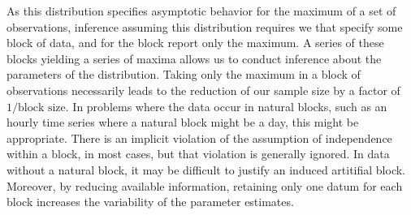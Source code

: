 As this distribution specifies asymptotic behavior for the maximum of a set of observations,
  inference assuming this distribution requires we that specify some block of data, and for the block
  report only the maximum.  A series of these blocks yielding a series of maxima allows us to conduct
  inference about the parameters of the distribution.  Taking only the
  maximum in a block of observations necessarily leads to the reduction of our sample size by a factor
  of $1/\text{block size}$. In problems where the data occur in natural blocks, such as an hourly time
  series where a natural block might be a day, this might be appropriate.  There is an implicit
  violation of the assumption of independence within a block, in most cases, but that violation is
  generally ignored. In data without a natural block, it may be difficult to justify an induced
  artitifial block. Moreover, by reducing available information, retaining only one datum for each
  block increases the variability of the parameter estimates.

